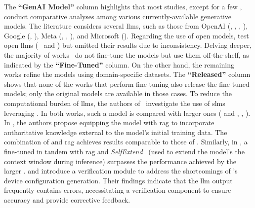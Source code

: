 The \textbf{``GenAI Model''} column highlights that most studies,
%
except for a few \cite{roychowdhury2024unlocking, duclos2024utilizing, wang2023making, mondal2023llms},
%
conduct comparative analyses among various currently-available generative models.
%
The literature considers several \glspl{llm}, such as those from OpenAI (\eg {},  , , ), Google (\eg {}, ), Meta (\eg {}, , ), and Microsoft (\eg {}).
%
Regarding the use of open models, \citet{mani2023enhancing} test open \glspl{llm} (\ie~ and ) but omitted their results due to inconsistency.
Delving deeper, the majority of works~\cite{soman2023observations, mani2023enhancing, shen2024large, ahmed2024linguistic, piovesan2024telecom, ghasemirahni2024deploying, wang2023making, mondal2023llms, ayed2024hermes} do not fine-tune the models but use them off-the-shelf, as indicated by the \textbf{``Fine-Tuned''} column. 
%
On the other hand, the remaining works \cite{roychowdhury2024unlocking, duclos2024utilizing, karapantelakis2024using, erak2024leveraging} refine the models using domain-specific datasets. 
%
The \textbf{``Released''} column shows that none of the works that perform fine-tuning also release the fine-tuned models;
only the original models are available in those cases.
%
To reduce the computational burden of \glspl{llm}, the authors of~\cite{piovesan2024telecom, erak2024leveraging} investigate the use of \glspl{slm} leveraging .
In both works, such a model is compared with larger ones (\ie {} and , , ).
In \cite{piovesan2024telecom}, the authors propose equipping the model with \gls{rag} to incorporate authoritative knowledge external to the model's initial training data. 
The combination of  and \gls{rag} achieves results comparable to those of .
Similarly, in \cite{erak2024leveraging}, a fine-tuned  in tandem with \gls{rag} and \emph{SelfExtend}~\cite{jin2024llm} (used to extend the model's the context window
during inference) surpasses the performance achieved by the larger .
%
\citet{wang2023making} and \citet{mondal2023llms} introduce a verification module to address the shortcomings of 's device configuration generation.
Their findings indicate that the \gls{llm} output frequently contains errors,
necessitating a verification component to ensure accuracy and provide corrective feedback.






















